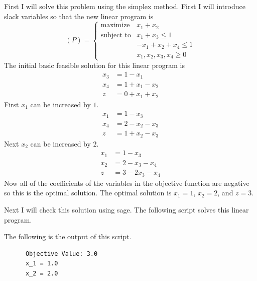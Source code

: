 \documentclass[11pt, oneside]{article}
\begin{document}
\begin{enumerate}
    First I will solve this problem using the simplex method.
    First I will introduce slack variables so that the new linear program is
    \[
      (P) =
      \begin{cases}
        \text{maximize}    &x_1+x_2 \\
        \text{subject to}  & x_1 + x_3 \leq 1 \\
                           & -x_1 + x_2 + x_4 \leq 1 \\
                           & x_1,x_2,x_3,x_4 \geq 0
      \end{cases}
    \]
    The initial basic feasible solution for this linear program is
    \begin{align*}
      x_3 &= 1 - x_1 \\
      x_4 &= 1 + x_1 - x_2 \\
      z &= 0 + x_1 + x_2
    \end{align*}
    First $x_1$ can be increased by $1$.
    \begin{align*}
      x_1 &= 1 - x_3 \\
      x_4 &= 2 - x_2 - x_3\\
      z &= 1 + x_2 - x_3
    \end{align*}
    Next $x_2$ can be increased by $2$.
    \begin{align*}
      x_1 &= 1 - x_3 \\
      x_2 &= 2 - x_3 - x_4\\
      z &= 3 - 2x_3 - x_4
    \end{align*}
    Now all of the coefficients of the variables in the objective function
    are negative so this is the optimal solution.
    The optimal solution is $x_1 = 1$, $x_2 = 2$, and $z = 3$.

    Next I will check this solution using sage.
    The following script solves this linear program.
    
    The following is the output of this script.
    \begin{verbatim}
      Objective Value: 3.0
      x_1 = 1.0
      x_2 = 2.0
    \end{verbatim}


\end{enumerate}
\end{document}

